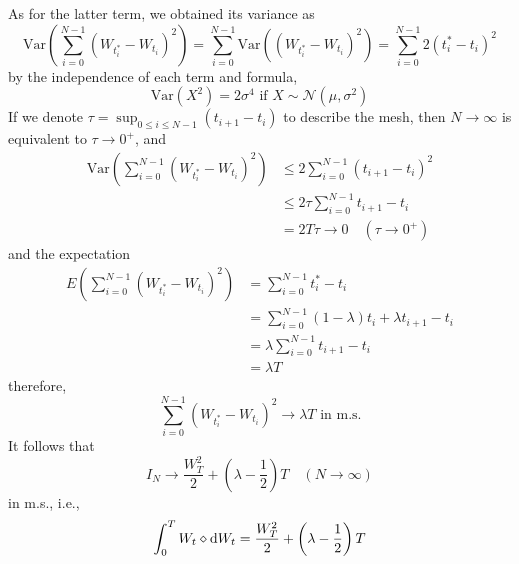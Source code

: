 \documentclass{homework}
\newcommand{\var}{\mathrm{Var}}
\begin{document}
    As for the latter term, we obtained its variance as
    \[\var\left(\sum_{i=0}^{N-1}(W_{t_i^*}-W_{t_i})^2\right)
    =\sum_{i=0}^{N-1}\var\left((W_{t_i^*}-W_{t_i})^2\right)
    =\sum_{i=0}^{N-1}2(t_i^*-t_i)^2\]
    by the independence of each term and formula,
    \[\var(X^2)=2\sigma^4\text{ if }X\sim\mathcal N(\mu,\sigma^2)\]
    If we denote $\tau=\sup_{0\leq i\leq N-1}(t_{i+1}-t_i)$ to describe
    the mesh, then $N\to\infty$ is equivalent to $\tau\to 0^+$, and
    \[\begin{aligned}
        \var\left(\sum_{i=0}^{N-1}(W_{t_i^*}-W_{t_i})^2\right)
    &\leq 2\sum_{i=0}^{N-1}(t_{i+1}-t_i)^2\\
    &\leq 2\tau\sum_{i=0}^{N-1}t_{i+1}-t_i\\
    &=2T\tau\to 0\quad(\tau\to 0^+)
    \end{aligned}\]
    and the expectation
    \[\begin{aligned}
        E\left(\sum_{i=0}^{N-1}(W_{t_i^*}-W_{t_i})^2\right)
        &=\sum_{i=0}^{N-1}t_i^*-t_i\\
        &=\sum_{i=0}^{N-1}(1-\lambda)t_i+\lambda t_{i+1}-t_i\\
        &=\lambda\sum_{i=0}^{N-1}t_{i+1}-t_{i}\\
        &=\lambda T
    \end{aligned}\]
    therefore,
    \[\sum_{i=0}^{N-1}(W_{t_i^*}-W_{t_i})^2\to\lambda T
    \text{ in m.s.}\]
    It follows that
    \[I_N\to \frac{W_T^2}{2}+\left(\lambda-\frac{1}{2}\right)T
    \quad(N\to\infty)\]
    in m.s., i.e.,
    \[\int_0^TW_t\diamond\mathrm d W_t=
    \frac{W_T^2}{2}+\left(\lambda-\frac{1}{2}\right)T\]
\end{document}
